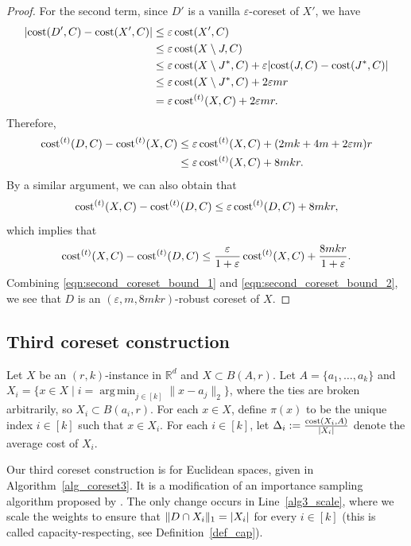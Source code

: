 \documentclass[11pt,letterpaper]{article}
\theoremstyle{definition}
\newcommand{\eps}{\varepsilon}
\DeclareMathOperator*{\argmin}{arg\,min}
\DeclarePairedDelimiter{\abs}{\lvert}{\rvert}
\DeclarePairedDelimiter{\norm}{\lVert}{\rVert}
\begin{document}
\begin{proof}
	For the second term, since $D'$ is a vanilla $\eps$-coreset of $X'$, we have
	\begin{align*}
		\abs{\cost(D', C) - \cost(X',C)} 
		&\leq \eps \cost(X', C) \\
		&\leq \eps \cost(X\setminus J, C) \\
		&\leq \eps \cost(X\setminus J^\ast, C) + \eps\abs{ \cost(J, C) - \cost(J^\ast, C) } \\
		&\leq \eps \cost(X\setminus J^\ast, C) + 2\eps m r \\
		&=\eps \cost[t](X,C) + 2\eps m r.
	\end{align*}
	Therefore,
    \begin{equation}\label{eqn:second_coreset_bound_1}
	\begin{aligned}
		\cost[t](D,C) - \cost[t](X,C)  
		&\leq \eps \cost^{(t)}(X, C) + (2mk+4m+2\eps m) r\\
		&\leq \eps\cost^{(t)}(X,C)+8mkr.
	\end{aligned}
    \end{equation}
    By a similar argument, we can also obtain that
    \[
        \cost[t](X,C) - \cost[t](D,C) \leq \eps\cost^{(t)}(D,C) + 8mkr,
    \]
    which implies that
    \begin{equation}\label{eqn:second_coreset_bound_2}
        \cost[t](X,C) - \cost[t](D,C) \leq \frac{\eps}{1+\eps}\cost^{(t)}(X,C) + \frac{8mkr}{1+\eps}.
    \end{equation}
	Combining \eqref{eqn:second_coreset_bound_1} and \eqref{eqn:second_coreset_bound_2}, we see that $D$ is an $(\eps,m,8mkr)$-robust coreset of $X$.
\end{proof}

\subsection{Third coreset construction}


Let $X$ be an $(r,k)$-instance in $\mathbb{R}^d$ and $X\subset B(A,r)$. Let $A=\{a_1,\dots,a_k\}$ and $X_i=\{x\in X\mid i = \argmin_{j\in [k]}\|x-a_j\|_2\}$, where the ties are broken arbitrarily, so $X_i\subset B(a_i,r)$.
%
For each $x\in X$, define $\pi(x)$ to be the unique index $i\in [k]$ such that $x\in X_i$. For each $i\in [k]$, let $\Delta_i := \frac{\cost(X_i,A)}{|X_i|}$ denote the average cost of $X_i$.

Our third coreset construction is for Euclidean spaces, given in Algorithm~\ref{alg_coreset3}. 
%
It is a modification of an importance sampling algorithm proposed by \cite{bansal2024sensitivity}. 
%
The only change occurs in Line~\ref{alg3_scale}, where we scale the weights to ensure that $\norm{D\cap X_i}_1 = \abs{X_i}$ for every $i\in [k]$ (this is called capacity-respecting, see Definition~\ref{def_cap}).
\end{document}
